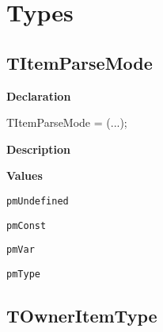 \documentclass{report}
\newif\ifpdf
\begin{document}
\section{Types}
\ifpdf
\subsection*{\large{\textbf{TItemParseMode}}\normalsize\hspace{1ex}\hrulefill}
\else
\subsection*{TItemParseMode}
\fi
\label{PasDoc_Parser-TItemParseMode}
\begin{list}{}{
\setlength{\itemindent}{0cm}
\setlength{\listparindent}{0cm}
\setlength{\leftmargin}{\evensidemargin}
\addtolength{\leftmargin}{\tmplength}
\settowidth{\labelsep}{X}
\addtolength{\leftmargin}{\labelsep}
\setlength{\labelwidth}{\tmplength}
}
\item[\textbf{Declaration}\hfill]
\ifpdf
\begin{flushleft}
\fi
\begin{ttfamily}
TItemParseMode = (...);\end{ttfamily}

\ifpdf
\end{flushleft}
\fi

\par
\item[\textbf{Description}]
 \item[\textbf{Values}]
\begin{description}
\item[\texttt{pmUndefined}] \label{PasDoc_Parser-pmUndefined}
\index{}
 
\item[\texttt{pmConst}] \label{PasDoc_Parser-pmConst}
\index{}
 
\item[\texttt{pmVar}] \label{PasDoc_Parser-pmVar}
\index{}
 
\item[\texttt{pmType}] \label{PasDoc_Parser-pmType}
\index{}
 
\end{description}


\end{list}
\ifpdf
\subsection*{\large{\textbf{TOwnerItemType}}\normalsize\hspace{1ex}\hrulefill}
\else
\end{document}
